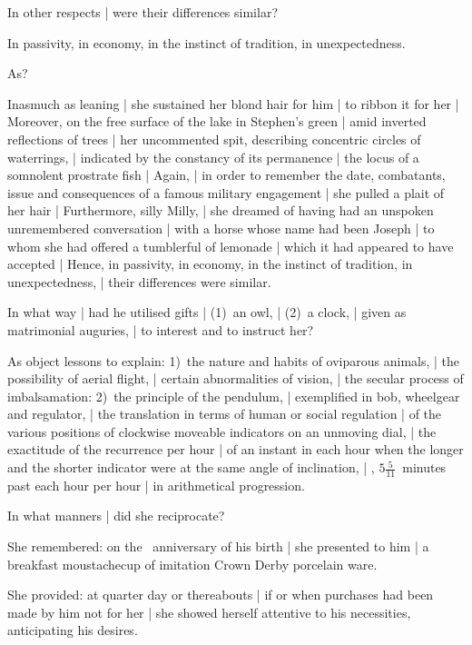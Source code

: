 In other respects |
were their differences similar?

\Philosophy
In passivity, in economy, in the instinct of tradition, in unexpectedness.


As?

\Philosophy
Inasmuch as leaning |
she sustained her blond hair for him |
to ribbon it for her |
Moreover, on the free surface of the lake in Stephen's green |
amid inverted reflections of trees |
her uncommented spit,
describing concentric circles of waterrings, |
indicated by the constancy of its permanence |
the locus of a somnolent prostrate fish |
Again, |
in order to remember the date, combatants,
issue and consequences of a famous military engagement |
she pulled a plait of her hair |
Furthermore, silly Milly, |
she dreamed of having had an unspoken unremembered conversation |
with a horse whose name had been Joseph |
to whom
she had offered a tumblerful of lemonade |
which it
had appeared to have accepted |
Hence, in passivity, in economy, in the instinct of tradition, in unexpectedness, |
their differences were similar.


In what way |
had he utilised gifts |
(1)~an owl, |
(2)~a clock, |
given as matrimonial auguries, |
to interest and to instruct her?

\Science
As object lessons to explain:
1)~the nature and habits of oviparous animals, |
the possibility of aerial flight, |
certain abnormalities of vision, |
the secular process of imbalsamation:
2)~the principle of the pendulum, |
exemplified in bob, wheelgear and regulator, |
the translation in terms of human or social regulation |
of the various positions of clockwise moveable indicators on an unmoving dial, |
the exactitude of the recurrence per hour |
of an instant in each hour when the longer and the
shorter indicator were at the same angle of inclination, |
,
$5\frac{5}{11}$~minutes past each hour per hour |
in arithmetical progression.


In what manners |
did she reciprocate?

\Memories
She remembered:
on the ~anniversary of his birth |
she presented to him |
a breakfast moustachecup of imitation Crown Derby porcelain ware.

\Household
She provided:
at quarter day or thereabouts |
if or when purchases had been made by him not for her |
she showed herself attentive to his necessities, anticipating his desires.

